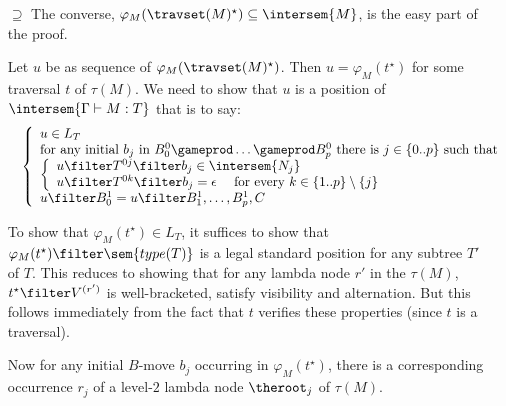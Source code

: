 \begin{itemize}[$\bullet$]
\begin{enumerate}
\begin{itemize}
    \end{itemize}

\item[$\supseteq$]
  The converse, $\varphi_{M}( \travset(M)^\star) \subseteq \intersem{M}$, is the easy part of the proof.
  
  Let $u$ be as sequence of $\varphi_{M}( \travset(M)^\star)$. Then 
  $u = \varphi_{M}(t^\star)$ for some traversal $t$ of $\tau(M)$. We need to show that
  $u$ is a position of $\intersem{\Gamma \vdash M : T}$ that is to say:
    \begin{eqnarray*}
    && \left\{
    \begin{array}{ll}
        u \in L_T \\
        \hbox{for any initial $b_j$ in $B_0^0 \gameprod \ldots \gameprod B_p^0$ there is $j \in \{0..p\}$ such that } \\
        \left\{\begin{array}{ll}
            u \filter T^{0j} \filter b_j  \in \intersem{N_j} \\
            u \filter T^{0k} \filter b_j  = \epsilon \quad \mbox{ for every } k\in \{1..p\}\setminus\{j\}
        \end{array}
        \right. \\
        u \filter B^1_0 = u \filter B^1_1, \ldots, B^1_p, C
    \end{array}
    \right.
    \end{eqnarray*}
    
    To show that $\varphi_{M}(t^\star) \in L_T$, it suffices to show that $\varphi_{M}(t^\star) \filter \sem{type(T)}$ is a legal 
    standard position for any subtree $T'$ of $T$. This reduces to showing that for any lambda node $r'$ in the $\tau(M)$,
    $t^\star \filter V^{(r')}$ is well-bracketed, satisfy visibility and alternation. But this follows immediately from the fact that $t$ verifies these properties (since $t$ is a traversal).
    
    Now for any initial $B$-move $b_j$ occurring in $\varphi_{M}(t^\star)$, there is a corresponding occurrence $r_j$ 
    of a level-$2$ lambda node $\theroot_j$ of $\tau(M)$.
    

\end{enumerate}
\end{itemize}
